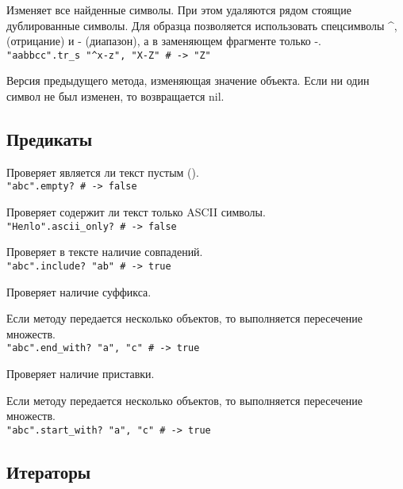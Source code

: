\begin{methodlist}
  Изменяет все найденные символы. При этом удаляются рядом стоящие дублированные символы. Для образца позволяется использовать спецсимволы \textasciicircum\-, (отрицание) и - (диапазон), а в заменяющем фрагменте только -.
  \\\verb!"aabbcc".tr_s "^x-z", "X-Z" # -> "Z"!

  Версия предыдущего метода, изменяющая значение объекта. Если ни один символ не был изменен, то возвращается nil.
\end{methodlist}

\subsection*{Предикаты}

\begin{methodlist}
  Проверяет является ли текст пустым ().
  \\\verb!"abc".empty? # -> false!

  Проверяет содержит ли текст только ASCII символы.
  \\\verb!"Heлlo".ascii_only? # -> false!

  Проверяет в тексте наличие совпадений. 
  \\\verb!"abc".include? "ab" # -> true!

  Проверяет наличие суффикса. 

  Если методу передается несколько объектов, то выполняется пересечение множеств.
  \\\verb!"abc".end_with? "a", "c" # -> true!

  Проверяет наличие приставки. 

  Если методу передается несколько объектов, то выполняется пересечение множеств.
  \\\verb!"abc".start_with? "a", "c" # -> true!
\end{methodlist}

\subsection*{Итераторы}

